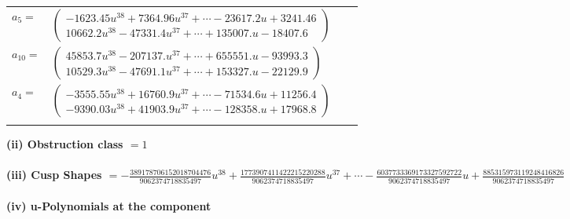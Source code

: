 \documentclass[1p]{elsarticle_modified}
\theoremstyle{definition}
\begin{document}
\begin{tabular}{m{7pt} m{180pt} m{7pt} m{180pt} }
\flushright $a_{5}=$&$\begin{pmatrix}-1623.45 u^{38}+7364.96 u^{37}+\cdots-23617.2 u+3241.46\\10662.2 u^{38}-47331.4 u^{37}+\cdots+135007. u-18407.6\end{pmatrix}$ \\
\flushright $a_{10}=$&$\begin{pmatrix}45853.7 u^{38}-207137. u^{37}+\cdots+655551. u-93993.3\\10529.3 u^{38}-47691.1 u^{37}+\cdots+153327. u-22129.9\end{pmatrix}$ \\
\flushright $a_{4}=$&$\begin{pmatrix}-3555.55 u^{38}+16760.9 u^{37}+\cdots-71534.6 u+11256.4\\-9390.03 u^{38}+41903.9 u^{37}+\cdots-128358. u+17968.8\end{pmatrix}$\\&\end{tabular}
\flushleft \textbf{(ii) Obstruction class $= 1$}\\~\\
\flushleft \textbf{(iii) Cusp Shapes $= -\frac{389178706152018704476}{9062374718835497} u^{38}+\frac{1773907411422215220288}{9062374718835497} u^{37}+\cdots-\frac{6037733369173327592722}{9062374718835497} u+\frac{885315973119248416826}{9062374718835497}$}\\~\\
\newpage\renewcommand{\arraystretch}{1}
\flushleft \textbf{(iv) u-Polynomials at the component}\newline \\
\end{document}
